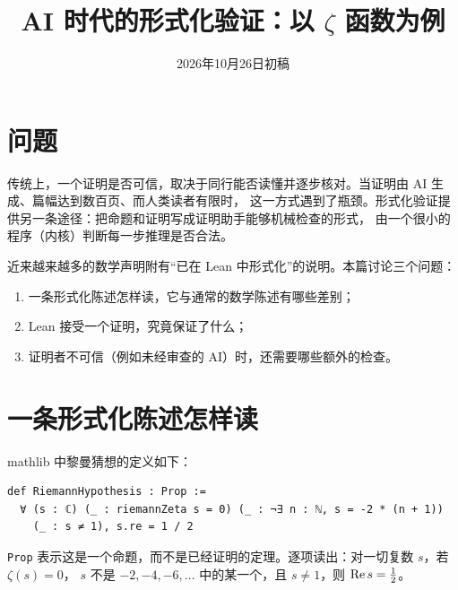 \documentclass[11pt]{article}
\date{2026年10月26日初稿}
\title{AI 时代的形式化验证：以 $\zeta$ 函数为例}
\begin{document}
\maketitle

\par\medskip

\section{问题}
传统上，一个证明是否可信，取决于同行能否读懂并逐步核对。当证明由 AI 生成、篇幅达到数百页、而人类读者有限时，
这一方式遇到了瓶颈。形式化验证提供另一条途径：把命题和证明写成证明助手能够机械检查的形式，
由一个很小的程序（内核）判断每一步推理是否合法。

近来越来越多的数学声明附有“已在 Lean 中形式化”的说明。本篇讨论三个问题：
\begin{enumerate}
 \item 一条形式化陈述怎样读，它与通常的数学陈述有哪些差别；
 \item Lean 接受一个证明，究竟保证了什么；
 \item 证明者不可信（例如未经审查的 AI）时，还需要哪些额外的检查。
\end{enumerate}

\section{一条形式化陈述怎样读}
mathlib 中黎曼猜想的定义如下：
\begin{Verbatim}
def RiemannHypothesis : Prop :=
  ∀ (s : ℂ) (_ : riemannZeta s = 0) (_ : ¬∃ n : ℕ, s = -2 * (n + 1))
    (_ : s ≠ 1), s.re = 1 / 2
\end{Verbatim}
\texttt{Prop} 表示这是一个命题，而不是已经证明的定理。逐项读出：对一切复数 $s$，若 $\zeta(s)=0$，
$s$ 不是 $-2,-4,-6,\dots$ 中的某一个，且 $s\ne1$，则 $\operatorname{Re} s=\tfrac12$。
\end{document}

